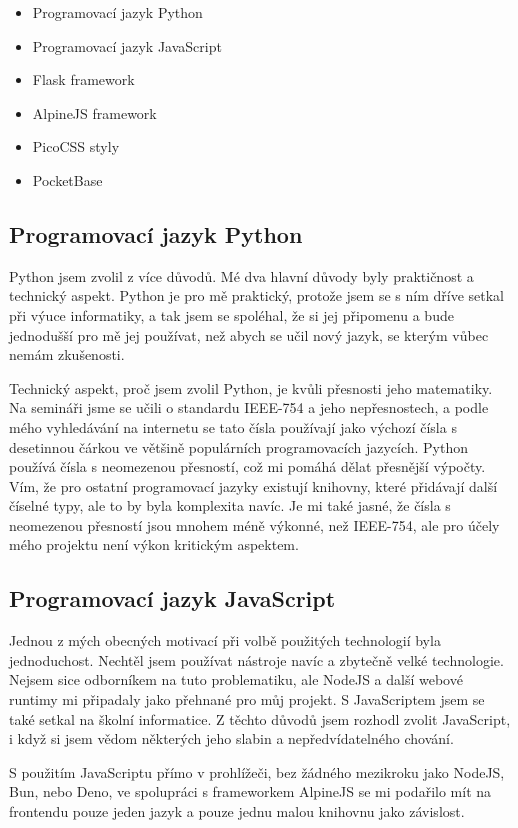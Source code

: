 \documentclass[11pt,a4paper,twoside,openright]{report}
\begin{document}
\begin{itemize}
  \item Programovací jazyk Python
  \item Programovací jazyk JavaScript
  \item Flask framework
  \item AlpineJS framework
  \item PicoCSS styly
  \item PocketBase
\end{itemize}

\subsection{Programovací jazyk Python}
Python jsem zvolil z více důvodů. Mé dva hlavní důvody byly praktičnost a technický aspekt. Python je
pro mě praktický, protože jsem se s ním dříve setkal při výuce informatiky, a tak jsem se spoléhal, že
si jej připomenu a bude jednodušší pro mě jej používat, než abych se učil nový jazyk, se kterým vůbec nemám
zkušenosti.

Technický aspekt, proč jsem zvolil Python, je kvůli přesnosti jeho matematiky. Na semináři jsme se učili o
standardu IEEE-754 a jeho nepřesnostech, a podle mého vyhledávání na internetu se tato čísla používají jako
výchozí čísla s desetinnou čárkou ve většině populárních programovacích jazycích. Python používá čísla s
neomezenou přesností, což mi pomáhá dělat přesnější výpočty. Vím, že pro ostatní programovací jazyky existují
knihovny, které přidávají další číselné typy, ale to by byla komplexita navíc. Je mi také jasné, že čísla
s neomezenou přesností jsou mnohem méně výkonné, než IEEE-754, ale pro účely mého projektu není výkon kritickým
aspektem.

\subsection{Programovací jazyk JavaScript}
Jednou z mých obecných motivací při volbě použitých technologií byla jednoduchost. Nechtěl jsem používat
nástroje navíc a zbytečně velké technologie. Nejsem sice odborníkem na tuto problematiku, ale NodeJS a další
webové runtimy mi připadaly jako přehnané pro můj projekt. S JavaScriptem jsem se také setkal na školní informatice.
Z těchto důvodů jsem rozhodl zvolit JavaScript, i když si jsem vědom některých jeho slabin a nepředvídatelného
chování.

S použitím JavaScriptu přímo v prohlížeči, bez žádného mezikroku jako NodeJS, Bun, nebo Deno, ve spolupráci
s frameworkem AlpineJS se mi podařilo mít na frontendu pouze jeden jazyk a pouze
jednu malou knihovnu jako závislost.
\end{document}
